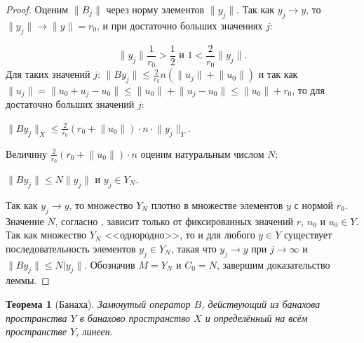\documentclass[12pt,a4paper,titlepage,oneside]{book}
\theoremstyle{definition}
\theoremstyle{plain}
\newtheorem*{theorem}{Теорема}
\theoremstyle{break}
\theoremstyle{remark}
\theoremstyle{remark}
\theoremstyle{remark}
\theoremstyle{remark}
\theoremstyle{plain}
\theoremstyle{plain}
\begin{document}
\begin{proof}
Оценим $\lVert B_j\rVert$ через норму элементов $\lVert y_j\rVert$. Так как $y_j \to y$, то $\lVert y_j\rVert \to \lVert y\rVert=r_0$, и при достаточно больших значениях $j$:

$$\lVert y_j\rVert\frac{1}{r_0}>\frac12 \mbox{ и } 1<\frac{2}{r_0}\lVert y_j\rVert.$$
Для таких значений $j$: $\lVert By_j \rVert \leqslant \frac{2}{r_0}n(\lVert u_j \rVert + \lVert u_0 \rVert)$ и так как $\lVert u_j \rVert = \lVert u_0 + u_j - u_0 \rVert \leqslant \lVert u_0 \rVert + \lVert u_j - u_0 \rVert \leqslant \lVert u_0 \rVert + r_0$, то для достаточно больших значений $j$:

\begin{center}
$\lVert By_j\rVert_X \leqslant \frac{2}{r_0}(r_0 + \lVert u_0\rVert)\cdot n\cdot \lVert y_j\rVert_Y$.
\end{center}

Величину $\frac{2}{r_0}(r_0 + \lVert u_0\rVert)\cdot n$ оценим натуральным числом $N$:

\begin{center}
$\lVert By_j\rVert \leqslant N\lVert y_j\rVert$ и $y_j \in Y_N$.
\end{center}

Так как $y_j \to y$, то множество $Y_N$ плотно в множестве элементов $y$ с нормой $r_0$. Значение $N$, согласно , зависит только от фиксированных значений $r$, $n_0$ и $u_0 \in Y$. Так как множество $Y_N$ <<однородно>>, то и для любого $y \in Y$ существует последовательность элементов $y_j \in Y_N$, такая что $y_j \to y$ при $j \to \infty$ и $\lVert By_j\rVert \leqslant N\lvert y_j\rVert$. Обозначив $M = Y_N$ и $C_0 = N$, завершим доказательство леммы.
\end{proof}

\begin{theorem}[Банаха]
Замкнутый оператор $B$, действующий из банахова пространства $Y$ в банахово пространство $X$ и определённый на всём пространстве $Y$, линеен.
\end{theorem}
\end{document}
